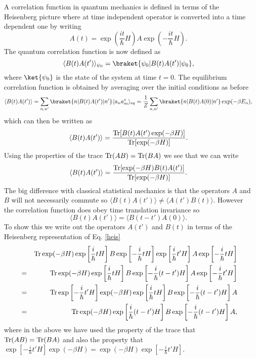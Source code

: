 A correlation function in quantum mechanics is defined in terms of the Heisenberg 
picture where at time independent operator is converted into a time dependent one
by writing
\begin{equation}
A(t) = \exp(\frac{it}{\hbar}H)A\exp(-\frac{it}{\hbar}H).\label{heis}
\end{equation}
The quantum correlation function is now defined as
\begin{equation}
\langle B(t) A(t')\rangle_{\psi_0} = \braket{ \psi_0|B(t)A(t')|\psi_0},
\end{equation} 
where $\ket{\psi_0}$ is the state of the system at time $t=0$. The equilibrium correlation function is obtained by averaging over the initial conditions as before
\begin{equation}
\langle B(t) A(t')\rangle =\sum_{n,n'} \braket{ n|B(t)A(t')|n'}\langle a_n a^*_m\rangle_{eq} = \frac{1}{Z}\sum_{n,n'} \braket{ n|B(t)A(0)|n'}\exp(-\beta E_n),
\end{equation} 
which can then be written as
\begin{equation}
\langle B(t) A(t')\rangle = \frac{{\rm Tr}[ B(t)A(t')\exp(-\beta H)]}{{\rm Tr}[ \exp(-\beta H)]}.
\end{equation}
Using the properties of the trace ${\rm Tr}(AB)= {\rm Tr}(BA)$ we see that we can write
\begin{equation}
 \langle B(t) A(t')\rangle = \frac{{\rm Tr}[ \exp(-\beta H)B(t)A(t')]}{{\rm Tr}[ \exp(-\beta H)]}.
\end{equation}
The big difference with classical statistical mechanics is that the operators $A$ and $B$ will
not necessarily commute so $\langle B(t) A(t')\rangle\neq \langle A(t') B(t)\rangle$. 
However the correlation function does obey time translation invariance so
\begin{equation}
\langle B(t) A(t')\rangle = \langle B(t-t') A(0)\rangle.
\end{equation}
To show this we write out the operators $A(t')$ and $B(t)$ in terms of the Heisenberg representation of Eq. \eqref{heis} 
\begin{eqnarray}
&&{\rm Tr} \exp(-\beta H) \exp\left[ \frac{i}{\hbar}tH\right] B \exp\left[ -\frac{i}{\hbar}tH\right]\exp\left[ \frac{i}{\hbar}t'H\right]A \exp\left[- \frac{i}{\hbar}tH\right]\nonumber \\
&=&{\rm Tr} \exp(-\beta H) \exp\left[ \frac{i}{\hbar}tH\right] B \exp\left[ -\frac{i}{\hbar}(t-t')H\right]A \exp\left[- \frac{i}{\hbar}t'H\right]\nonumber \\
&=& {\rm Tr} \exp\left[- \frac{i}{\hbar}t'H\right]
\exp(-\beta H) \exp\left[ \frac{i}{\hbar}tH\right] B \exp\left[ -\frac{i}{\hbar}(t-t')H\right]A  \nonumber \\
&=&{\rm Tr} 
\exp(-\beta H) \exp\left[ \frac{i}{\hbar}(t-t')H\right] B \exp\left[ -\frac{i}{\hbar}(t-t')H\right]A,
\end{eqnarray}
where in the above we have used the property of the trace that ${\rm Tr}(AB)= {\rm Tr}(BA)$ and also the property that $\exp\left[- \frac{i}{\hbar}t'H\right]
\exp(-\beta H)=\exp(-\beta H)\exp\left[- \frac{i}{\hbar}t'H\right]$.




